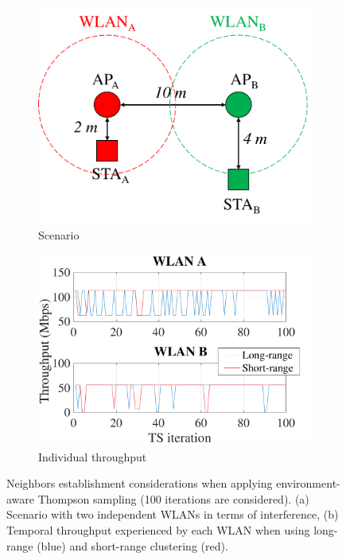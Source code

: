 \documentclass[preprint,12pt]{elsarticle}
\begin{document}
\begin{figure}[h!]
	\centering   		
	\begin{subfigure}[b]{0.35\textwidth}
		\includegraphics[width=\textwidth]{s2_new}
		\caption{Scenario}
		\label{fig:informed_s1}
	\end{subfigure}
	\begin{subfigure}[b]{0.4\textwidth}
		\includegraphics[width=\textwidth]{clustering_benefits}
		\caption{Individual throughput}
		\label{fig:clustering_benefits}
	\end{subfigure}
	\caption{Neighbors establishment considerations when applying environment-aware Thompson sampling (100 iterations are considered). (a) Scenario with two independent WLANs in terms of interference, (b) Temporal throughput experienced by each WLAN when using long-range (blue) and short-range clustering (red).}
	\label{fig:clustering}
\end{figure}   	
\end{document}
